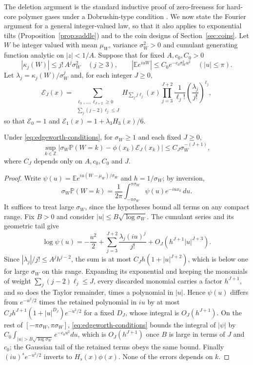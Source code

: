 \documentclass[11pt,a4paper]{article}
\theoremstyle{definition}\newtheorem{remark}[theorem]{Remark}\newtheorem{conjecture}{Conjecture}
\newcommand{\E}{\mathbb E}\newcommand{\Prb}{\mathbb P}\newcommand{\Var}{\operatorname{Var}}
\begin{document}
The deletion argument is the standard inductive proof of zero-freeness for hard-core polymer gases under a Dobrushin-type condition \cite{sokal}. We now state the Fourier argument for a general integer-valued law, so that it also applies to exponential tilts (Proposition~\ref{prop:saddle}) and to the coin designs of Section~\ref{sec:coins}. Let $W$ be integer valued with mean $\mu_W$, variance $\sigma_W^2>0$ and cumulant generating function analytic on $|z|<1/A$. Suppose that for fixed $A,c_0,C_0>0$
\begin{equation}\label{eq:edgeworth-conditions}
 |\kappa_j(W)|\le j!\, A^j\sigma_W^2\quad(j\ge3),\qquad
 |\E e^{iuW}|\le C_0 e^{-c_0\sigma_W^2u^2}\quad (|u|\le\pi).
\end{equation}
Let $\lambda_j=\kappa_j(W)/\sigma_W^j$ and, for each integer $J\ge0$,
\[
 \mathcal E_J(x)=
 \sum_{\substack{\ell_3,\ldots,\ell_{J+2}\ge0\\
                  \sum_{j}(j-2)\ell_j\le J}}
 H_{\sum_{j}j\ell_j}(x)
 \prod_{j=3}^{J+2}\frac1{\ell_j!}
                 \left(\frac{\lambda_j}{j!}\right)^{\ell_j},
\]
so that $\mathcal E_0=1$ and $\mathcal E_1(x)=1+\lambda_3H_3(x)/6$.

\begin{lemma}\label{lem:edgeworth}
Under \eqref{eq:edgeworth-conditions}, for $\sigma_W\ge1$ and each fixed $J\ge0$,
\[
 \sup_{k\in\mathbb Z}
 \left|\sigma_W\Prb(W=k)-\phi(x_k)\mathcal E_J(x_k)\right|
 \le C_J\sigma_W^{-(J+1)},
\]
where $C_J$ depends only on $A,c_0,C_0$ and $J$.
\end{lemma}
\begin{proof}
Write $\psi(u)=\E e^{iu(W-\mu_W)/\sigma_W}$ and $h=1/\sigma_W$; by inversion,
\[\sigma_W\Prb(W=k)=\frac1{2\pi}\int_{-\pi\sigma_W}^{\pi\sigma_W}\psi(u)e^{-iux_k}\,du.\] It suffices to treat large $\sigma_W$, since the hypotheses bound all terms on any compact range. Fix $B>0$ and consider $|u|\le B\sqrt{\log\sigma_W}$. The cumulant series and its geometric tail give
\[
 \log\psi(u)=-\frac{u^2}2+\sum_{j=3}^{J+2}\frac{\lambda_j(iu)^j}{j!}+O_J\!\left(h^{J+1}|u|^{J+3}\right).
\]
Since $|\lambda_j|/j!\le A^jh^{j-2}$, the sum is at most $C_Jh(1+|u|^{J+2})$, which is below one for large $\sigma_W$ on this range. Expanding its exponential and keeping the monomials of weight $\sum_j(j-2)\ell_j\le J$, every discarded monomial carries a factor $h^{J+1}$, and so does the Taylor remainder, times a polynomial in $|u|$. Hence $\psi(u)$ differs from $e^{-u^2/2}$ times the retained polynomial in $iu$ by at most $C_Jh^{J+1}(1+|u|^{D_J})e^{-u^2/2}$ for a fixed $D_J$, whose integral is $O_J(h^{J+1})$. On the rest of $[-\pi\sigma_W,\pi\sigma_W]$, \eqref{eq:edgeworth-conditions} bounds the integral of $|\psi|$ by $C_0\int_{|u|>B\sqrt{\log\sigma_W}}e^{-c_0u^2}du$, which is $O_J(h^{J+1})$ once $B$ is large in terms of $J$ and $c_0$; the Gaussian tail of the retained terms obeys the same bound. Finally $(iu)^se^{-u^2/2}$ inverts to $H_s(x)\phi(x)$. None of the errors depends on $k$.
\end{proof}
\end{document}
